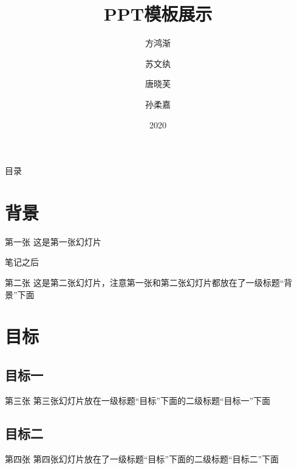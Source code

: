 \documentclass[10pt]{ctexbeamer} %
\title{PPT模板展示}
\author{方鸿渐\inst{2} \and 苏文纨\inst{1} \and 唐晓芙\inst{1} \and 孙柔嘉\inst{2}}
\institute{
  \inst{1}
  上海大户人家
  \and
  \inst{2}
  三闾大学
}
\date{2020}
\begin{document}
\begin{frame}
  \titlepage
\end{frame}


\begin{frame}{目录}
 \tableofcontents
\end{frame}



    
\section{背景}
\begin{frame}{第一张}
    这是第一张幻灯片  
    
    笔记之后

\end{frame}
\begin{frame}{第二张}
    这是第二张幻灯片，注意第一张和第二张幻灯片都放在了一级标题“背景”下面
\end{frame}

\section{目标}
\subsection{目标一}
\begin{frame}{第三张}
    第三张幻灯片放在一级标题“目标”下面的二级标题“目标一”下面
\end{frame}
\subsection{目标二}
\begin{frame}{第四张}
    第四张幻灯片放在了一级标题“目标”下面的二级标题“目标二”下面
\end{frame}
\end{document}
